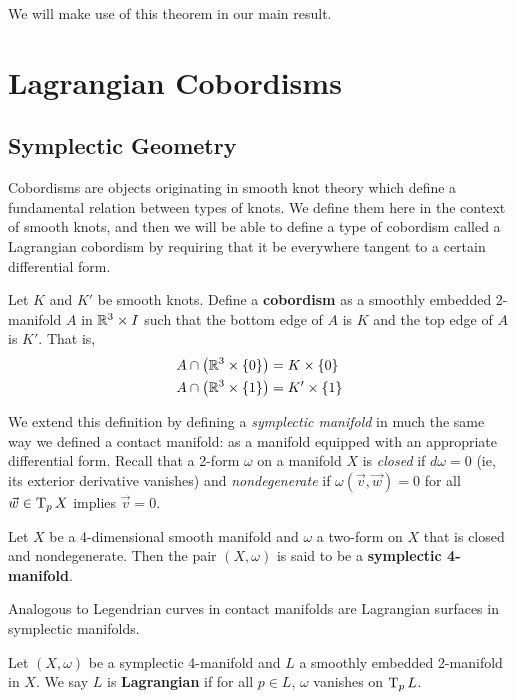 We will make use of this theorem in our main result.

\section{Lagrangian Cobordisms}

\subsection{Symplectic Geometry}

Cobordisms are objects originating in smooth knot theory which define a fundamental relation between types of knots. We define them here in the context of smooth knots, and then we will be able to define a type of cobordism called a Lagrangian cobordism by requiring that it be everywhere tangent to a certain differential form.

\begin{definition}
    Let $K$ and $K'$ be smooth knots. Define a \textbf{cobordism} as a smoothly embedded 2-manifold $A$ in $\mathbb{R}^3 \times I$ such that the bottom edge of $A$ is $K$ and the top edge of $A$ is $K'$. That is,
    \begin{align*}
        A \cap \left(\mathbb{R}^3 \times \{0\}\right) &= K \times \{0\}\\
        A \cap \left(\mathbb{R}^3 \times \{1\}\right) &= K' \times \{1\}
    \end{align*}
\end{definition}

We extend this definition by defining a \emph{symplectic manifold} in much the same way we defined a contact manifold: as a manifold equipped with an appropriate differential form. Recall that a 2-form $\omega$ on a manifold $X$ is \emph{closed} if $d \omega = 0$ (ie, its exterior derivative vanishes) and \emph{nondegenerate} if $\omega(\vec v, \vec w) = 0$ for all $\vec w \in \operatorname{T}_p X$ implies $\vec v = 0$.

\begin{definition}
    Let $X$ be a 4-dimensional smooth manifold and $\omega$ a two-form on $X$ that is closed and nondegenerate. Then the pair $(X, \omega)$ is said to be a \textbf{symplectic 4-manifold}.
\end{definition}

Analogous to Legendrian curves in contact manifolds are Lagrangian surfaces in symplectic manifolds.
\begin{definition}
    Let $(X, \omega)$ be a symplectic 4-manifold and $L$ a smoothly embedded 2-manifold in $X$. We say $L$ is \textbf{Lagrangian} if for all $p \in L$, $\omega$ vanishes on $\operatorname{T}_p L$.
\end{definition}

